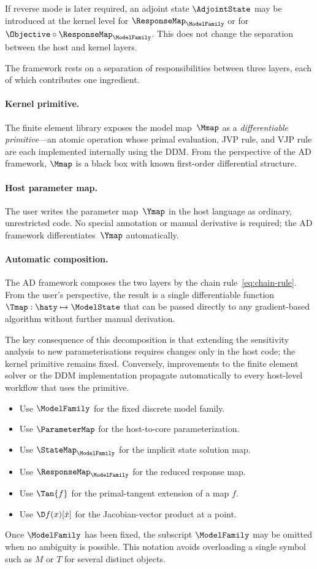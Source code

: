If reverse mode is later required, an adjoint state \(\AdjointState\) may be introduced at the kernel level for \(\ResponseMap_{\ModelFamily}\) or for \(\Objective\circ\ResponseMap_{\ModelFamily}\). This does not change the separation between the host and kernel layers.


The framework rests on a separation of responsibilities between
three layers, each of which contributes one ingredient.

\paragraph{Kernel primitive.}
The finite element library exposes the model map~$\Mmap$ as a
\emph{differentiable primitive}---an atomic operation whose primal
evaluation, JVP rule, and VJP rule are each implemented internally
using the DDM.  
From the perspective of the AD framework, $\Mmap$ is
a black box with known first-order differential structure. 

\paragraph{Host parameter map.}
The user writes the parameter map~$\Ymap$ in the host language as
ordinary, unrestricted code.  
No special annotation or manual
derivative is required; the AD framework differentiates~$\Ymap$
automatically.

\paragraph{Automatic composition.}
The AD framework composes the two layers by the chain
rule~\eqref{eq:chain-rule}.  
From the user's perspective, the result
is a single differentiable function
$\Tmap : \haty \mapsto \ModelState$ that can be passed directly to any
gradient-based algorithm without further manual derivation.

The key consequence of this decomposition is that extending the
sensitivity analysis to new parameterisations requires changes only in
the host code; the kernel primitive remains fixed.  
Conversely, improvements to the finite element solver or the DDM implementation
propagate automatically to every host-level workflow that uses the
primitive.



\begin{itemize}
    \item Use \(\ModelFamily\) for the fixed discrete model family.
    \item Use \(\ParameterMap\) for the host-to-core parameterization.
    \item Use \(\StateMap_{\ModelFamily}\) for the implicit state solution map.
    \item Use \(\ResponseMap_{\ModelFamily}\) for the reduced response map.
    \item Use \(\Tan{f}\) for the primal-tangent extension of a map \(f\).
    \item Use \(\D f(x)[\dot x]\) for the Jacobian-vector product at a point.
\end{itemize}

Once \(\ModelFamily\) has been fixed, the subscript \(\ModelFamily\) may be omitted when no ambiguity is possible. This notation avoids overloading a single symbol such as \(M\) or \(T\) for several distinct objects.
